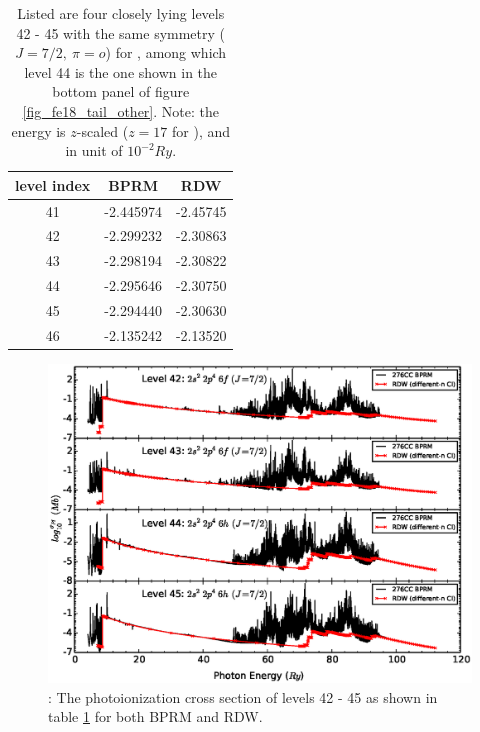 \begin{table}
	\centering
	\caption{Listed are four closely lying levels 42 - 45 with the same symmetry ($J = 7/2,~\pi = o$) for , among which level 44 is the one shown in the bottom panel of figure \ref{fig_fe18_tail_other}. Note: the energy is $z$-scaled ($z=17$ for ), and in unit of $10^{-2} Ry$.}
	\begin{tabular} { |c || c | c |}
		\hline
		level index & BPRM & RDW \\
		\hline
		41 & -2.445974 & -2.45745 \\
		42 & -2.299232 & -2.30863 \\
		43 & -2.298194 & -2.30822 \\
		44 & -2.295646 & -2.30750 \\
		45 & -2.294440 & -2.30630 \\
		46 & -2.135242 & -2.13520 \\
		\hline	  								   
	\end{tabular}
	\label{table_7_1_44}
\end{table}

\begin{figure}
	\centering
	\includegraphics[width=\textwidth]{figures/fe18_mismatch_not_matter.eps}
	\caption{: The photoionization cross section of levels 42 - 45 as shown in table \ref{table_7_1_44} for both BPRM and RDW. }
	\label{fig_7_1_44_not_matter}
\end{figure}

